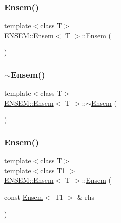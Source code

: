 \subsubsection{\texorpdfstring{Ensem()}{Ensem()}\hspace{0.1cm}{\footnotesize\ttfamily [4/6]}}
{\footnotesize\ttfamily template$<$class T$>$ \\
\mbox{\hyperlink{classENSEM_1_1Ensem}{E\+N\+S\+E\+M\+::\+Ensem}}$<$ T $>$\+::\mbox{\hyperlink{classENSEM_1_1Ensem}{Ensem}} (\begin{DoxyParamCaption}{ }\end{DoxyParamCaption})\hspace{0.3cm}{\ttfamily [inline]}}

\mbox{\label{classENSEM_1_1Ensem_a01e4e19b101048ad2ffcf886017592c9}} 
\subsubsection{\texorpdfstring{$\sim$Ensem()}{~Ensem()}\hspace{0.1cm}{\footnotesize\ttfamily [2/2]}}
{\footnotesize\ttfamily template$<$class T$>$ \\
\mbox{\hyperlink{classENSEM_1_1Ensem}{E\+N\+S\+E\+M\+::\+Ensem}}$<$ T $>$\+::$\sim$\mbox{\hyperlink{classENSEM_1_1Ensem}{Ensem}} (\begin{DoxyParamCaption}{ }\end{DoxyParamCaption})\hspace{0.3cm}{\ttfamily [inline]}}

\mbox{\label{classENSEM_1_1Ensem_ab0e04ebf09af997fb7f1477cdc48145b}} 
\subsubsection{\texorpdfstring{Ensem()}{Ensem()}\hspace{0.1cm}{\footnotesize\ttfamily [5/6]}}
{\footnotesize\ttfamily template$<$class T$>$ \\
template$<$class T1 $>$ \\
\mbox{\hyperlink{classENSEM_1_1Ensem}{E\+N\+S\+E\+M\+::\+Ensem}}$<$ T $>$\+::\mbox{\hyperlink{classENSEM_1_1Ensem}{Ensem}} (\begin{DoxyParamCaption}\item[{const \mbox{\hyperlink{classENSEM_1_1Ensem}{Ensem}}$<$ T1 $>$ \&}]{rhs }\end{DoxyParamCaption})\hspace{0.3cm}{\ttfamily [inline]}}



